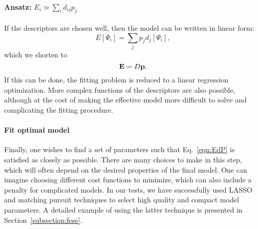 \paragraph{Ansatz: $E_i \simeq \sum_i  d_{ij} p_j$} 
If the descriptors are chosen well, then the model can be written in linear form:
\begin{equation}
E[\Psi_i] = \sum_j p_j d_j[\Psi_i],	
\end{equation}
which we shorten to 
\begin{equation}
{\bf E} = D{\bf p} .
\label{eqn:EdP}
\end{equation}
If this can be done, the fitting problem is reduced to a linear regression optimization.
More complex functions of the descriptors are also possible, although at the cost of making the effective model more difficult to solve and complicating the fitting procedure.


\paragraph{Fit optimal model}
Finally, one wishes to find a set of parameters such that Eq.~\eqref{eqn:EdP} is satisfied as closely as possible. 
There are many choices to make in this step, which will often depend on the desired properties of the final model. 
One can imagine choosing different cost functions to minimize, which can also include a penalty for complicated models. 
In our tests, we have successfully used LASSO \cite{Lasso} and matching pursuit techniques \cite{MP_Zhang1993} to select high quality and compact model parameters. 
A detailed example of using the latter technique is presented in Section~\ref{subsection:fese}.


